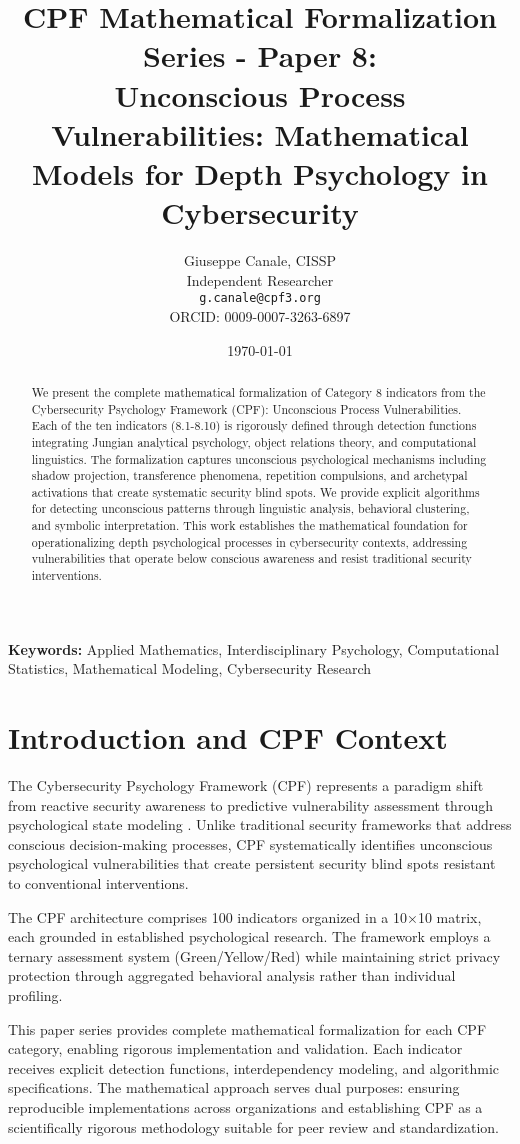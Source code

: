 \documentclass[11pt,a4paper]{article}
\title{CPF Mathematical Formalization Series - Paper 8:\\Unconscious Process Vulnerabilities: Mathematical Models for Depth Psychology in Cybersecurity}
\author{
    Giuseppe Canale, CISSP\\
    Independent Researcher\\
    \texttt{g.canale@cpf3.org}\\
    ORCID: 0009-0007-3263-6897
}
\date{\today}
\begin{document}
\maketitle

\begin{abstract}
We present the complete mathematical formalization of Category 8 indicators from the Cybersecurity Psychology Framework (CPF): Unconscious Process Vulnerabilities. Each of the ten indicators (8.1-8.10) is rigorously defined through detection functions integrating Jungian analytical psychology, object relations theory, and computational linguistics. The formalization captures unconscious psychological mechanisms including shadow projection, transference phenomena, repetition compulsions, and archetypal activations that create systematic security blind spots. We provide explicit algorithms for detecting unconscious patterns through linguistic analysis, behavioral clustering, and symbolic interpretation. This work establishes the mathematical foundation for operationalizing depth psychological processes in cybersecurity contexts, addressing vulnerabilities that operate below conscious awareness and resist traditional security interventions.
\end{abstract}

\textbf{Keywords:} Applied Mathematics, Interdisciplinary Psychology, Computational Statistics, Mathematical Modeling, Cybersecurity Research

\section{Introduction and CPF Context}

The Cybersecurity Psychology Framework (CPF) represents a paradigm shift from reactive security awareness to predictive vulnerability assessment through psychological state modeling \cite{canale2024cpf}. Unlike traditional security frameworks that address conscious decision-making processes, CPF systematically identifies unconscious psychological vulnerabilities that create persistent security blind spots resistant to conventional interventions.

The CPF architecture comprises 100 indicators organized in a 10×10 matrix, each grounded in established psychological research. The framework employs a ternary assessment system (Green/Yellow/Red) while maintaining strict privacy protection through aggregated behavioral analysis rather than individual profiling.

This paper series provides complete mathematical formalization for each CPF category, enabling rigorous implementation and validation. Each indicator receives explicit detection functions, interdependency modeling, and algorithmic specifications. The mathematical approach serves dual purposes: ensuring reproducible implementations across organizations and establishing CPF as a scientifically rigorous methodology suitable for peer review and standardization.
\end{document}
